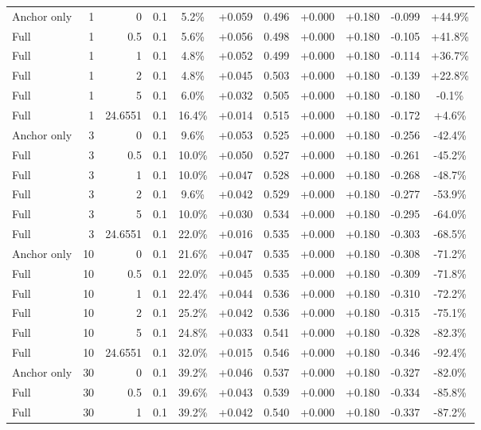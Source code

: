 \begin{table}[htbp]
\begin{tabular}{lrrrccccccc}
Anchor only & 1 & 0 & 0.1 & 5.2\% & +0.059 & 0.496 & +0.000 & +0.180 & -0.099 & +44.9\% \\
Full & 1 & 0.5 & 0.1 & 5.6\% & +0.056 & 0.498 & +0.000 & +0.180 & -0.105 & +41.8\% \\
Full & 1 & 1 & 0.1 & 4.8\% & +0.052 & 0.499 & +0.000 & +0.180 & -0.114 & +36.7\% \\
Full & 1 & 2 & 0.1 & 4.8\% & +0.045 & 0.503 & +0.000 & +0.180 & -0.139 & +22.8\% \\
Full & 1 & 5 & 0.1 & 6.0\% & +0.032 & 0.505 & +0.000 & +0.180 & -0.180 & -0.1\% \\
Full & 1 & 24.6551 & 0.1 & 16.4\% & +0.014 & 0.515 & +0.000 & +0.180 & -0.172 & +4.6\% \\
Anchor only & 3 & 0 & 0.1 & 9.6\% & +0.053 & 0.525 & +0.000 & +0.180 & -0.256 & -42.4\% \\
Full & 3 & 0.5 & 0.1 & 10.0\% & +0.050 & 0.527 & +0.000 & +0.180 & -0.261 & -45.2\% \\
Full & 3 & 1 & 0.1 & 10.0\% & +0.047 & 0.528 & +0.000 & +0.180 & -0.268 & -48.7\% \\
Full & 3 & 2 & 0.1 & 9.6\% & +0.042 & 0.529 & +0.000 & +0.180 & -0.277 & -53.9\% \\
Full & 3 & 5 & 0.1 & 10.0\% & +0.030 & 0.534 & +0.000 & +0.180 & -0.295 & -64.0\% \\
Full & 3 & 24.6551 & 0.1 & 22.0\% & +0.016 & 0.535 & +0.000 & +0.180 & -0.303 & -68.5\% \\
Anchor only & 10 & 0 & 0.1 & 21.6\% & +0.047 & 0.535 & +0.000 & +0.180 & -0.308 & -71.2\% \\
Full & 10 & 0.5 & 0.1 & 22.0\% & +0.045 & 0.535 & +0.000 & +0.180 & -0.309 & -71.8\% \\
Full & 10 & 1 & 0.1 & 22.4\% & +0.044 & 0.536 & +0.000 & +0.180 & -0.310 & -72.2\% \\
Full & 10 & 2 & 0.1 & 25.2\% & +0.042 & 0.536 & +0.000 & +0.180 & -0.315 & -75.1\% \\
Full & 10 & 5 & 0.1 & 24.8\% & +0.033 & 0.541 & +0.000 & +0.180 & -0.328 & -82.3\% \\
Full & 10 & 24.6551 & 0.1 & 32.0\% & +0.015 & 0.546 & +0.000 & +0.180 & -0.346 & -92.4\% \\
Anchor only & 30 & 0 & 0.1 & 39.2\% & +0.046 & 0.537 & +0.000 & +0.180 & -0.327 & -82.0\% \\
Full & 30 & 0.5 & 0.1 & 39.6\% & +0.043 & 0.539 & +0.000 & +0.180 & -0.334 & -85.8\% \\
Full & 30 & 1 & 0.1 & 39.2\% & +0.042 & 0.540 & +0.000 & +0.180 & -0.337 & -87.2\% \\

\end{tabular}
\end{table}
